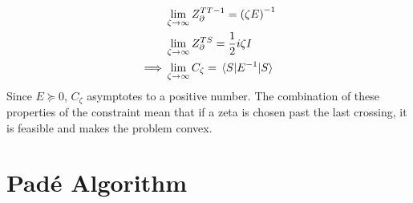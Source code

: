 \documentclass[reprint]{revtex4-2}
\begin{document}
\begin{align}
	&\lim_{\zeta\rightarrow\infty}Z^{TT-1}_\partial = \qty(\zeta E)^{-1}\\
	&\lim_{\zeta\rightarrow\infty}Z^{TS}_\partial = \frac{1}{2}i\zeta I\\
	\implies&\lim_{\zeta\rightarrow\infty} C_\zeta = \ev{E^{-1}}{S}
\end{align}
Since $E\succcurlyeq0$, $C_\zeta$ asymptotes to a positive number. The combination of these properties of the constraint mean that if a zeta is chosen past the last crossing, it is feasible and makes the problem convex.

\section{Padé Algorithm}
\label{sec:algorithm}


\end{document}
